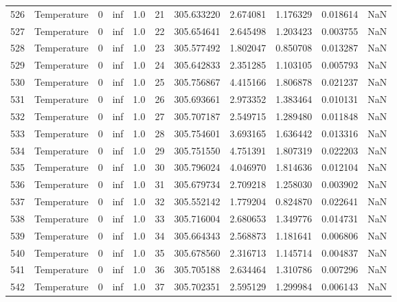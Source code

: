\begin{tabular}{llrrrrrrrrr}
526 &  Temperature &       0 &  inf &  1.0 &   21 &  305.633220 &  2.674081 &  1.176329 &   0.018614 &      NaN \\
527 &  Temperature &       0 &  inf &  1.0 &   22 &  305.654641 &  2.645498 &  1.203423 &   0.003755 &      NaN \\
528 &  Temperature &       0 &  inf &  1.0 &   23 &  305.577492 &  1.802047 &  0.850708 &   0.013287 &      NaN \\
529 &  Temperature &       0 &  inf &  1.0 &   24 &  305.642833 &  2.351285 &  1.103105 &   0.005793 &      NaN \\
530 &  Temperature &       0 &  inf &  1.0 &   25 &  305.756867 &  4.415166 &  1.806878 &   0.021237 &      NaN \\
531 &  Temperature &       0 &  inf &  1.0 &   26 &  305.693661 &  2.973352 &  1.383464 &   0.010131 &      NaN \\
532 &  Temperature &       0 &  inf &  1.0 &   27 &  305.707187 &  2.549715 &  1.289480 &   0.011848 &      NaN \\
533 &  Temperature &       0 &  inf &  1.0 &   28 &  305.754601 &  3.693165 &  1.636442 &   0.013316 &      NaN \\
534 &  Temperature &       0 &  inf &  1.0 &   29 &  305.751550 &  4.751391 &  1.807319 &   0.022203 &      NaN \\
535 &  Temperature &       0 &  inf &  1.0 &   30 &  305.796024 &  4.046970 &  1.814636 &   0.012104 &      NaN \\
536 &  Temperature &       0 &  inf &  1.0 &   31 &  305.679734 &  2.709218 &  1.258030 &   0.003902 &      NaN \\
537 &  Temperature &       0 &  inf &  1.0 &   32 &  305.552142 &  1.779204 &  0.824870 &   0.022641 &      NaN \\
538 &  Temperature &       0 &  inf &  1.0 &   33 &  305.716004 &  2.680653 &  1.349776 &   0.014731 &      NaN \\
539 &  Temperature &       0 &  inf &  1.0 &   34 &  305.664343 &  2.568873 &  1.181641 &   0.006806 &      NaN \\
540 &  Temperature &       0 &  inf &  1.0 &   35 &  305.678560 &  2.316713 &  1.145714 &   0.004837 &      NaN \\
541 &  Temperature &       0 &  inf &  1.0 &   36 &  305.705188 &  2.634464 &  1.310786 &   0.007296 &      NaN \\
542 &  Temperature &       0 &  inf &  1.0 &   37 &  305.702351 &  2.595129 &  1.299984 &   0.006143 &      NaN \\

\end{tabular}
